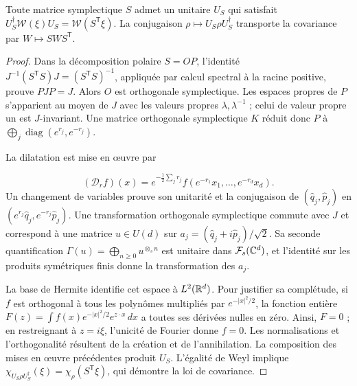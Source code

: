\begin{lemma}
\label{app:lem:implementacion-simplectica}
Toute matrice symplectique \(S\) admet un unitaire \(U_S\) qui satisfait
\(U_S^\dagger\mathcal W(\xi)U_S=\mathcal W(S^{\mathsf T}\xi)\).
La conjugaison \(\rho\mapsto U_S\rho U_S^\dagger\) transporte
la covariance par \(W\mapsto SWS^{\mathsf T}\).
\end{lemma}
\begin{proof}
Dans la décomposition polaire \(S=OP\), l’identité
\(J^{-1}(S^{\mathsf T}S)J=(S^{\mathsf T}S)^{-1}\), appliquée par
calcul spectral à la racine positive, prouve \(PJP=J\).
Alors \(O\) est orthogonale symplectique. Les espaces propres de \(P\)
s’apparient au moyen de \(J\) avec les valeurs propres \(\lambda,\lambda^{-1}\) ;
celui de valeur propre un est \(J\)-invariant. Une matrice
orthogonale symplectique \(K\) réduit donc \(P\) à
\(\bigoplus_j\operatorname{diag}(e^{r_j},e^{-r_j})\).

La dilatation est mise en œuvre par

\[
 (\mathcal D_rf)(x)=e^{-\frac12\sum_jr_j}
 f(e^{-r_1}x_1,\ldots,e^{-r_d}x_d).
\]
Un changement de variables prouve son unitarité et la conjugaison de
\((\widehat q_j,\widehat p_j)\) en
\((e^{r_j}\widehat q_j,e^{-r_j}\widehat p_j)\).
Une transformation orthogonale symplectique commute avec \(J\) et
correspond à une matrice \(u\in U(d)\) sur
\(a_j=(\widehat q_j+i\widehat p_j)/\sqrt2\). Sa seconde
quantification \(\Gamma(u)=\bigoplus_{n\geq0}u^{\otimes_s n}\)
est unitaire dans \(\mathcal F_s(\mathbb C^d)\), et l’identité sur les
produits symétriques finis donne la transformation des \(a_j\).

La base de Hermite identifie cet espace à \(L^2(\mathbb R^d)\).
Pour justifier sa complétude, si \(f\) est orthogonal à tous les
polynômes multipliés par \(e^{-|x|^2/2}\), la fonction entière
\(F(z)=\int f(x)e^{-|x|^2/2}e^{z\cdot x}\,dx\) a toutes
ses dérivées nulles en zéro. Ainsi, \(F=0\) ; en restreignant à
\(z=i\xi\), l’unicité de Fourier donne \(f=0\). Les
normalisations et l’orthogonalité résultent de la création et de l’annihilation.
La composition des mises en œuvre précédentes produit \(U_S\).
L’égalité de Weyl implique
\(\chi_{U_S\rho U_S^\dagger}(\xi)=\chi_\rho(S^{\mathsf T}\xi)\),
qui démontre la loi de covariance.

\end{proof}

